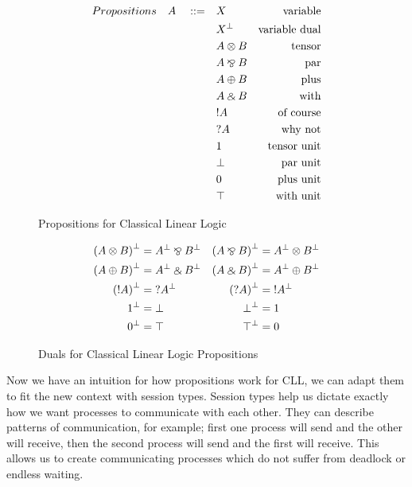 \begin{figure}[h]
  \begin{align*}
      Propositions \quad A \quad ::= \quad & X &\text{variable} \\
      & \negg{X} &\text{variable dual} \\
      & A \otimes B &\text{tensor} \\
      & A \parr B &\text{par} \\
      & A \oplus B &\text{plus} \\
      & A \with B &\text{with} \\
      & \ofc A &\text{of course} \\
      & \whynot A &\text{why not} \\
      & 1 &\text{tensor unit} \\
      & \bot &\text{par unit} \\
      & 0 &\text{plus unit} \\
      & \top &\text{with unit} \\
  \end{align*}
  \caption{Propositions for Classical Linear Logic}
  \label{fig: p cll}
\end{figure}

\begin{figure}
  \begin{align*}
    \negg{(A \otimes B)} &= \negg{A} \parr \negg{B} & \negg{(A \parr B)} &= \negg{A} \otimes \negg{B} \\
    \negg{(A \oplus B)} &= \negg{A} \with \negg{B} & \negg{(A \with B)} &= \negg{A} \oplus \negg{B} \\
    \negg{(\ofc A)} &= \whynot \negg{A} & \negg{(\whynot A)} &= \ofc \negg{A} \\
    \negg{1} &= \bot & \negg{\bot} &= 1 \\
    \negg{0} &= \top & \negg{\top} &= 0
  \end{align*}
  \caption{Duals for Classical Linear Logic Propositions}
  \label{fig: duals}
\end{figure}

\noindent
Now we have an intuition for how propositions work for CLL, we can adapt them to fit the new context with session types. 
Session types help us dictate exactly how we want processes to communicate with each other. They can describe patterns 
of communication, for example; first one process will send and the other will receive, then the second process will send and 
the first will receive. This allows us to create communicating processes which do not suffer from deadlock or endless waiting. \\

